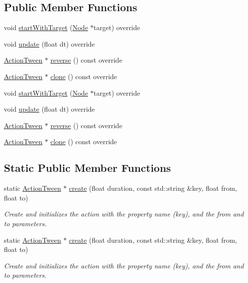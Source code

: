 \subsection*{Public Member Functions}
\begin{DoxyCompactItemize}
\item 
void \hyperlink{classActionTween_ae530a9f86b98f8d4a336c4b0774311aa}{start\+With\+Target} (\hyperlink{classNode}{Node} $\ast$target) override
\item 
void \hyperlink{classActionTween_a57ff5b74c67554251c0294192d56d744}{update} (float dt) override
\item 
\hyperlink{classActionTween}{Action\+Tween} $\ast$ \hyperlink{classActionTween_af33247b6dd16a802630413ae0e03e3a1}{reverse} () const override
\item 
\hyperlink{classActionTween}{Action\+Tween} $\ast$ \hyperlink{classActionTween_aff915e251fce5eaac6c44871407c62e4}{clone} () const override
\item 
void \hyperlink{classActionTween_ae530a9f86b98f8d4a336c4b0774311aa}{start\+With\+Target} (\hyperlink{classNode}{Node} $\ast$target) override
\item 
void \hyperlink{classActionTween_a57ff5b74c67554251c0294192d56d744}{update} (float dt) override
\item 
\hyperlink{classActionTween}{Action\+Tween} $\ast$ \hyperlink{classActionTween_a1f90cd6b9dafd8f4ab90947406b9930c}{reverse} () const override
\item 
\hyperlink{classActionTween}{Action\+Tween} $\ast$ \hyperlink{classActionTween_aa0eb9ca9073fb3ff7040698029bb49ff}{clone} () const override
\end{DoxyCompactItemize}
\subsection*{Static Public Member Functions}
\begin{DoxyCompactItemize}
\item 
static \hyperlink{classActionTween}{Action\+Tween} $\ast$ \hyperlink{classActionTween_ac687f53bff3399fef691582730a185e8}{create} (float duration, const std\+::string \&key, float from, float to)
\begin{DoxyCompactList}\small\item\em Create and initializes the action with the property name (key), and the from and to parameters. \end{DoxyCompactList}\item 
static \hyperlink{classActionTween}{Action\+Tween} $\ast$ \hyperlink{classActionTween_ad755571c82b6ccdf81d4720306655b24}{create} (float duration, const std\+::string \&key, float from, float to)
\begin{DoxyCompactList}\small\item\em Create and initializes the action with the property name (key), and the from and to parameters. \end{DoxyCompactList}\end{DoxyCompactItemize}

